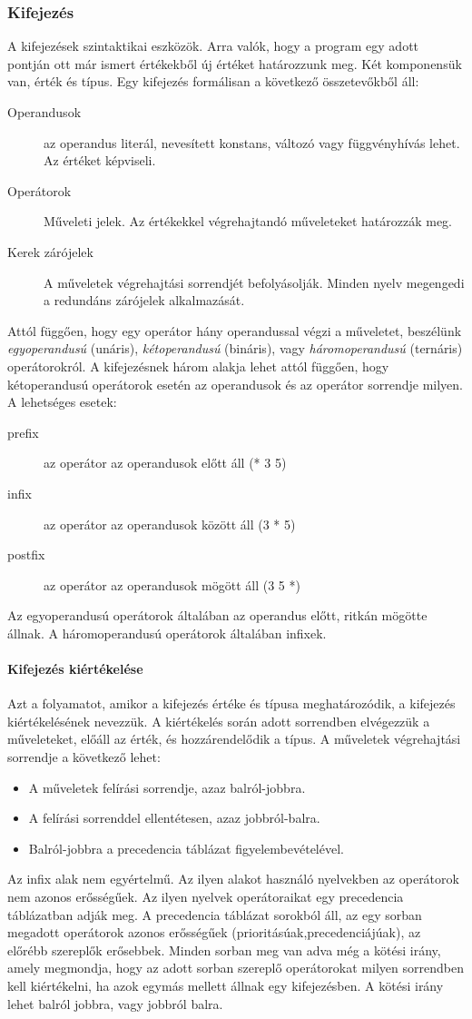 \subsubsection{Kifejezés}
A kifejezések szintaktikai eszközök. Arra valók, hogy a program egy adott pontján ott már ismert értékekből új értéket határozzunk meg. Két komponensük van, érték és típus. Egy kifejezés formálisan a következő összetevőkből áll:
\begin{description}
\item[Operandusok] az operandus literál, nevesített konstans, változó vagy függvényhívás lehet. Az értéket képviseli.
\item[Operátorok] Műveleti jelek. Az értékekkel végrehajtandó műveleteket határozzák meg.
\item[Kerek zárójelek] A műveletek végrehajtási sorrendjét befolyásolják. Minden nyelv megengedi a redundáns zárójelek alkalmazását.
\end{description}
Attól függően, hogy egy operátor hány operandussal végzi a műveletet, beszélünk \emph{egyoperandusú} (unáris), \emph{kétoperandusú} (bináris), vagy \emph{háromoperandusú} (ternáris) operátorokról. A kifejezésnek három alakja lehet attól függően, hogy kétoperandusú operátorok esetén az operandusok és az operátor sorrendje milyen. A lehetséges esetek:
\begin{description}
\item[prefix] az operátor az operandusok előtt áll (* 3 5)
\item[infix] az operátor az operandusok között áll (3 * 5)
\item[postfix] az operátor az operandusok mögött áll (3 5 *)
\end{description}
Az egyoperandusú operátorok általában az operandus előtt, ritkán mögötte állnak. A háromoperandusú operátorok általában infixek.
\paragraph{Kifejezés kiértékelése} Azt a folyamatot, amikor a kifejezés értéke és típusa meghatározódik, a kifejezés kiértékelésének nevezzük. A kiértékelés során adott sorrendben elvégezzük a műveleteket, előáll az érték, és hozzárendelődik a típus. A műveletek végrehajtási sorrendje a következő lehet:
\begin{itemize}[noitemsep]
	\item A műveletek felírási sorrendje, azaz balról-jobbra.
	\item A felírási sorrenddel ellentétesen, azaz jobbról-balra.
	\item Balról-jobbra a precedencia táblázat figyelembevételével.
\end{itemize}
Az infix alak nem egyértelmű. Az ilyen alakot használó nyelvekben az operátorok nem azonos erősségűek. Az ilyen nyelvek operátoraikat egy precedencia táblázatban adják meg. A precedencia táblázat sorokból áll, az egy sorban megadott operátorok azonos erősségűek (prioritásúak,precedenciájúak), az előrébb szereplők erősebbek. Minden sorban meg van adva még a kötési irány,
amely megmondja, hogy az adott sorban szereplő operátorokat milyen sorrendben kell kiértékelni, ha azok egymás mellett állnak egy kifejezésben. A kötési irány lehet balról jobbra, vagy jobbról balra.

